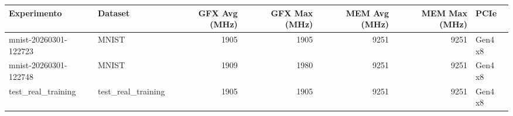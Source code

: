 \begin{tabular}{llrrrrl}
\toprule
Experimento & Dataset & GFX Avg (MHz) & GFX Max (MHz) & MEM Avg (MHz) & MEM Max (MHz) & PCIe \\
\midrule
mnist-20260301-122723 & MNIST & 1905 & 1905 & 9251 & 9251 & Gen4 x8 \\
mnist-20260301-122748 & MNIST & 1909 & 1980 & 9251 & 9251 & Gen4 x8 \\
test_real_training & test_real_training & 1905 & 1905 & 9251 & 9251 & Gen4 x8 \\
\bottomrule
\end{tabular}